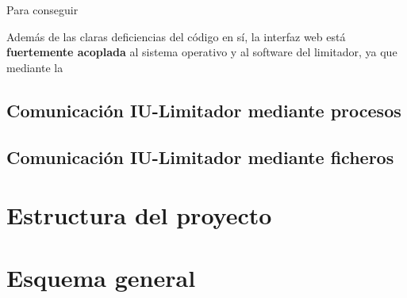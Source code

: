 Para conseguir

Además de las claras deficiencias del código en sí, la interfaz web está \textbf{fuertemente acoplada} al sistema operativo y al software del limitador, ya que mediante la

\subsection{Comunicación IU-Limitador mediante procesos}

\subsection{Comunicación IU-Limitador mediante ficheros}

\section{Estructura del proyecto}


\section{Esquema general}

%
%
%

